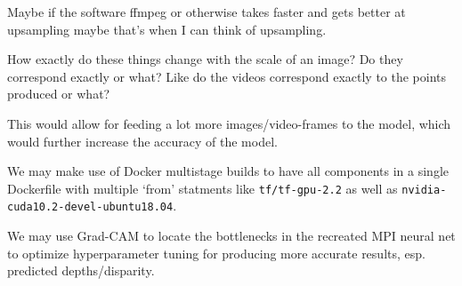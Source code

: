 Maybe if the software ffmpeg or otherwise takes faster and gets better at upsampling maybe that's when I can think of upsampling.

How exactly do these things change with the scale of an image? 
Do they correspond exactly or what? Like do the videos correspond exactly to the points produced or what?

This would allow for feeding a lot more images/video-frames to the model, which would further increase the accuracy of the model.

We may make use of Docker multistage builds to have all components in a single Dockerfile with multiple `from' statments like \texttt{tf/tf-gpu-2.2} as well as \texttt{nvidia-cuda10.2-devel-ubuntu18.04}.

 We may use Grad-CAM to locate the bottlenecks in the recreated MPI neural net to optimize hyperparameter tuning for producing more accurate results, esp. predicted depths/disparity.